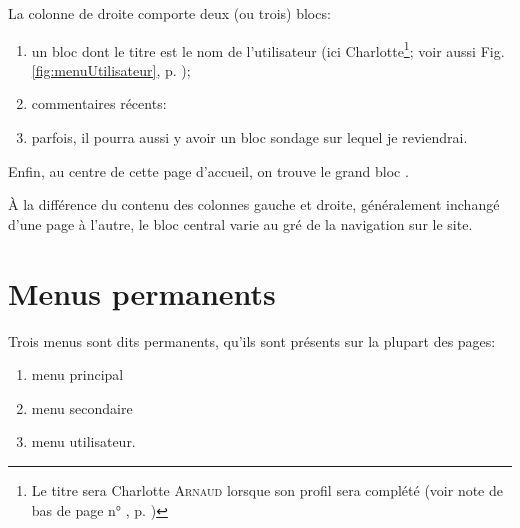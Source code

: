 
La colonne de droite comporte deux (ou trois) blocs: 
\begin{enumerate}
    \item un bloc dont le titre est le nom de l’utilisateur (ici Charlotte\footnote{Le titre sera Charlotte \textsc{Arnaud} lorsque son profil sera complété (voir note de bas de page n° \thenoteProfilPasAJour, p. \pageref{page:profilPasAJour})}; voir aussi Fig. \ref{fig:menuUtilisateur}, p. \pageref{fig:menuUtilisateur});
    \item commentaires récents:
    \item parfois, il pourra aussi y avoir un bloc sondage sur lequel je reviendrai.
\end{enumerate}



Enfin, au centre de cette page d'accueil, on trouve le grand bloc .

À la différence du contenu des colonnes gauche et droite, généralement inchangé d'une page à l'autre, le bloc central varie au gré de la navigation sur le site.


\section{Menus permanents}

Trois menus sont dits permanents, \cad qu’ils sont présents sur la plupart des pages:
\begin{enumerate}
    \item menu principal\;
    \item menu secondaire\;
    \item menu utilisateur.
\end{enumerate}

